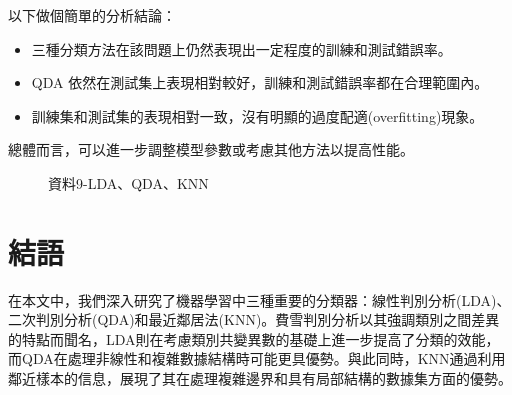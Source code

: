 以下做個簡單的分析結論：
\begin{itemize}
\item 三種分類方法在該問題上仍然表現出一定程度的訓練和測試錯誤率。
\item QDA 依然在測試集上表現相對較好，訓練和測試錯誤率都在合理範圍內。
\item 訓練集和測試集的表現相對一致，沒有明顯的過度配適(overfitting)現象。
\end{itemize}
總體而言，可以進一步調整模型參數或考慮其他方法以提高性能。\\
\begin{table} [H]
\centering
    \caption{資料9之LDA、QDA、KNN錯判率}\label{tb:la9-LDAQDAKNN}
    \renewcommand\arraystretch{1.5}
\end{table}
\begin{figure}[H]
    \caption{資料9-LDA、QDA、KNN}
    \label{fig:la9-LDAQDAKNN}
\end{figure}

\section{結語}
在本文中，我們深入研究了機器學習中三種重要的分類器：線性判別分析(LDA)、二次判別分析(QDA)和最近鄰居法(KNN)。費雪判別分析以其強調類別之間差異的特點而聞名，LDA則在考慮類別共變異數的基礎上進一步提高了分類的效能，而QDA在處理非線性和複雜數據結構時可能更具優勢。與此同時，KNN通過利用鄰近樣本的信息，展現了其在處理複雜邊界和具有局部結構的數據集方面的優勢。

